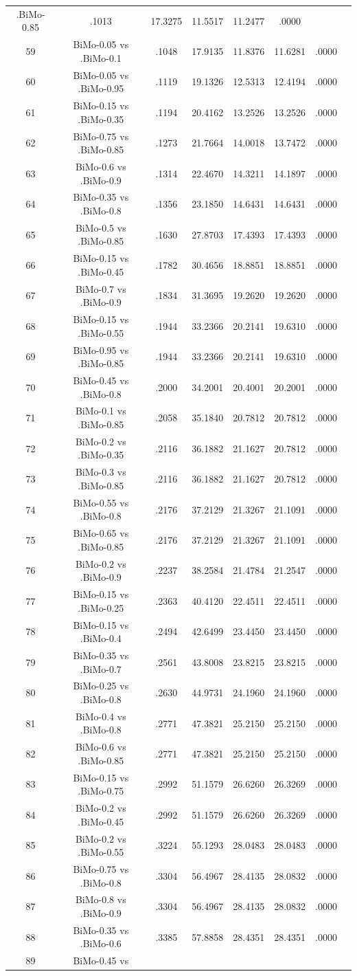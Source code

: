 \documentclass[a4paper,10pt]{article}
\begin{document}
\begin{landscape}
\begin{table}[!htp]
\begin{tabular}{cccccccc}
.BiMo-0.85&.1013&17.3275&11.5517&11.2477&.0000\\59&BiMo-0.05 vs .BiMo-0.1&.1048&17.9135&11.8376&11.6281&.0000\\60&BiMo-0.05 vs .BiMo-0.95&.1119&19.1326&12.5313&12.4194&.0000\\61&BiMo-0.15 vs .BiMo-0.35&.1194&20.4162&13.2526&13.2526&.0000\\62&BiMo-0.75 vs .BiMo-0.85&.1273&21.7664&14.0018&13.7472&.0000\\63&BiMo-0.6 vs .BiMo-0.9&.1314&22.4670&14.3211&14.1897&.0000\\64&BiMo-0.35 vs .BiMo-0.8&.1356&23.1850&14.6431&14.6431&.0000\\65&BiMo-0.5 vs .BiMo-0.85&.1630&27.8703&17.4393&17.4393&.0000\\66&BiMo-0.15 vs .BiMo-0.45&.1782&30.4656&18.8851&18.8851&.0000\\67&BiMo-0.7 vs .BiMo-0.9&.1834&31.3695&19.2620&19.2620&.0000\\68&BiMo-0.15 vs .BiMo-0.55&.1944&33.2366&20.2141&19.6310&.0000\\69&BiMo-0.95 vs .BiMo-0.85&.1944&33.2366&20.2141&19.6310&.0000\\70&BiMo-0.45 vs .BiMo-0.8&.2000&34.2001&20.4001&20.2001&.0000\\71&BiMo-0.1 vs .BiMo-0.85&.2058&35.1840&20.7812&20.7812&.0000\\72&BiMo-0.2 vs .BiMo-0.35&.2116&36.1882&21.1627&20.7812&.0000\\73&BiMo-0.3 vs .BiMo-0.85&.2116&36.1882&21.1627&20.7812&.0000\\74&BiMo-0.55 vs .BiMo-0.8&.2176&37.2129&21.3267&21.1091&.0000\\75&BiMo-0.65 vs .BiMo-0.85&.2176&37.2129&21.3267&21.1091&.0000\\76&BiMo-0.2 vs .BiMo-0.9&.2237&38.2584&21.4784&21.2547&.0000\\77&BiMo-0.15 vs .BiMo-0.25&.2363&40.4120&22.4511&22.4511&.0000\\78&BiMo-0.15 vs .BiMo-0.4&.2494&42.6499&23.4450&23.4450&.0000\\79&BiMo-0.35 vs .BiMo-0.7&.2561&43.8008&23.8215&23.8215&.0000\\80&BiMo-0.25 vs .BiMo-0.8&.2630&44.9731&24.1960&24.1960&.0000\\81&BiMo-0.4 vs .BiMo-0.8&.2771&47.3821&25.2150&25.2150&.0000\\82&BiMo-0.6 vs .BiMo-0.85&.2771&47.3821&25.2150&25.2150&.0000\\83&BiMo-0.15 vs .BiMo-0.75&.2992&51.1579&26.6260&26.3269&.0000\\84&BiMo-0.2 vs .BiMo-0.45&.2992&51.1579&26.6260&26.3269&.0000\\85&BiMo-0.2 vs .BiMo-0.55&.3224&55.1293&28.0483&28.0483&.0000\\86&BiMo-0.75 vs .BiMo-0.8&.3304&56.4967&28.4135&28.0832&.0000\\87&BiMo-0.8 vs .BiMo-0.9&.3304&56.4967&28.4135&28.0832&.0000\\88&BiMo-0.35 vs .BiMo-0.6&.3385&57.8858&28.4351&28.4351&.0000\\89&BiMo-0.45 vs 
\end{tabular}
\end{table}
\end{landscape}
\end{document}

